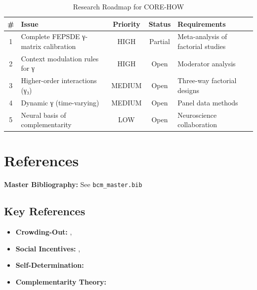 \begin{table}[htbp]
\centering
\caption{Research Roadmap for CORE-HOW}
\label{tab:how-roadmap}
\renewcommand{\arraystretch}{1.3}
\begin{tabular}{@{}clccl@{}}
\toprule
\textbf{\#} & \textbf{Issue} & \textbf{Priority} & \textbf{Status} & \textbf{Requirements} \\
\midrule
1 & Complete FEPSDE γ-matrix calibration & HIGH & Partial & Meta-analysis of factorial studies \\
2 & Context modulation rules for γ & HIGH & Open & Moderator analysis \\
3 & Higher-order interactions (γ₃) & MEDIUM & Open & Three-way factorial designs \\
4 & Dynamic γ (time-varying) & MEDIUM & Open & Panel data methods \\
5 & Neural basis of complementarity & LOW & Open & Neuroscience collaboration \\
\bottomrule
\end{tabular}
\end{table}


\section{References}
\label{sec:how-references}

\begin{tcolorbox}[colback=blue!5!white, colframe=blue!75!black]
\textbf{Master Bibliography:} See \texttt{bcm\_master.bib}
\end{tcolorbox}

\subsection{Key References}

\begin{itemize}[nosep]
\item \textbf{Crowding-Out:} \citet{frey1997relationship}, \citet{deci1999meta}
\item \textbf{Social Incentives:} \citet{gneezy2011pay}, \citet{ariely2009doing}
\item \textbf{Self-Determination:} \citet{ryan2000self}
\item \textbf{Complementarity Theory:} \citet{milgrom1990job}
\end{itemize}

